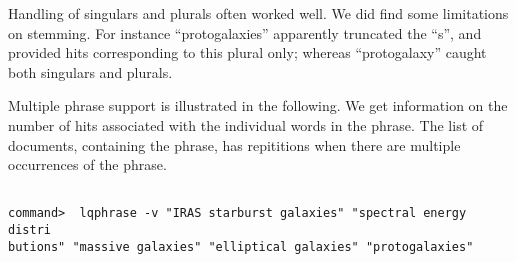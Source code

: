 Handling of singulars and plurals often worked well.
We did find some limitations on stemming.  For instance ``protogalaxies'' 
apparently truncated the ``s'', and provided hits corresponding to this 
plural only; whereas ``protogalaxy'' caught both singulars and plurals.

Multiple phrase support is illustrated in the following.  We get information
on the number of hits associated with the individual words in the phrase.
The list of documents, containing the phrase, has repititions when there 
are multiple occurrences of the phrase.

\begin{verbatim}

command>  lqphrase -v "IRAS starburst galaxies" "spectral energy distri
butions" "massive galaxies" "elliptical galaxies" "protogalaxies"

\end{verbatim}

